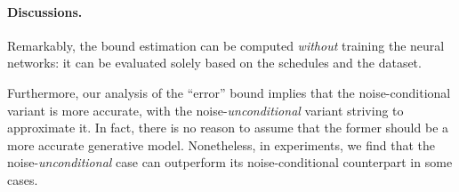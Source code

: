 \paragraph{Discussions.}
Remarkably, the bound estimation can be computed \textit{without} training the neural networks: it can be evaluated solely based on the schedules and the dataset. 

Furthermore, our analysis of the ``error'' bound implies that the noise-conditional variant is more accurate, with the noise-\textit{unconditional} variant striving to approximate it. In fact, there is no reason to assume that the former should be a more accurate generative model. Nonetheless, in experiments, we find that the noise-\textit{unconditional} case can outperform its noise-conditional counterpart in some cases.


